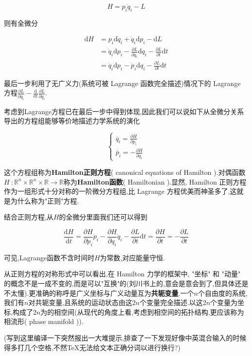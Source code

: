 \documentclass[UTF8]{article}
\newcommand{\D}{\mathrm{d}}
\begin{document}
	\[H = p_{i}\dot{q}_{i} - L\]
	
	则有全微分
	
	\[\begin{aligned}
		\D H &= p_{i} \D \dot{q}_{i} + \dot{q}_{i} \D p_{i} - \D L\\
			 &= \dot{q}_{i} \D p_{i} - \frac{\partial L}{\partial q_{i}} \D q_{i} - \frac{\partial L}{\partial t} \D t\\
			 &= \dot{q}_{i} \D p_{i} - \dot{p}_{i} \D q_{i} - \frac{\partial L}{\partial t} \D t
	\end{aligned}\]
	
	最后一步利用了无广义力(系统可被 Lagrange 函数完全描述)情况下的 Lagrange 方程$\frac{\partial L}{\partial q_{i}} - \frac{\D}{\D t}\frac{\partial L}{\partial \dot{q}_{i}}$.
	
	考虑到Lagrange方程已在最后一步中得到体现,因此我们可以说如下从全微分关系导出的方程组能够等价地描述力学系统的演化
	
	\[\begin{cases}
		\dot{q_{i}} = \frac{\partial H}{\partial p_{i}}\\
		\dot{p_{i}} = -\frac{\partial H}{\partial q_{i}}
	\end{cases}\]
	
	这个方程组称为\textbf{Hamilton正则方程}( canonical equations of Hamilton ).对偶函数$H~: \mathbb{R}^n \times \mathbb{R}^n \times \mathbb{R} \to \mathbb{R}$称为\textbf{Hamilton函数}( Hamiltonian ).显然, Hamilton 正则方程作为一组形式十分对称的一阶微分方程组,比 Lagrange 方程优美而神圣多了,这就是为什么称为"正则"方程.
	
	结合正则方程,从$H$的全微分里面我们还可以得到
	
	\[\frac{\D H}{\D t} = \frac{\partial H}{\partial p_{i}} \dot{p}_{i} - \frac{\partial H}{\partial q_{i}} \dot{q}_{i} - \frac{\partial L}{\partial t} \D t = \frac{\partial H}{\partial t}= - \frac{\partial L}{\partial t}\]
	
	可见,Lagrange函数不含时间时$H$为常数,对应能量守恒.
	
	从正则方程的对称形式中可以看出,在 Hamilton 力学的框架中, "坐标" 和 "动量" 的概念不是一成不变的,而是可以"互换"的(刘川书上的,意会是意会到了,但具体还是不太懂).更准确的称呼是广义坐标与广义动量互为\textbf{共轭变量}.一个$n$个自由度的系统,我们有$n$对共轭变量,且系统的运动状态由这$2n$个变量完全描述.以这$2n$个变量为坐标,构成了$2n$为的相空间(从现代的角度上看,考虑到相空间的拓扑结构,更应该称为相流形( phase manifold )).
	
	(写到这里编译一下突然报出一大堆提示,排查了一下发现好像中英混合输入的时候得多打几个空格,不然TeX无法给文本正确分词以进行换行?)
	
\end{document}
